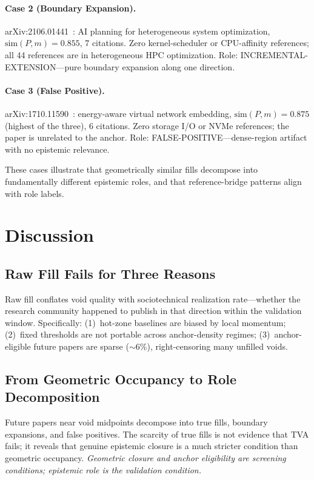\documentclass[sigconf]{acmart}
\newcommand{\tva}{\textsf{TVA}}
\begin{document}
\paragraph{Case 2 (Boundary Expansion).}
arXiv:2106.01441~\cite{case2}: AI planning for heterogeneous system optimization,
$\mathrm{sim}(P, m) = 0.855$, 7 citations.
Zero kernel-scheduler or CPU-affinity references; all 44 references are in
heterogeneous HPC optimization.
Role: INCREMENTAL-EXTENSION---pure boundary expansion along one direction.

\paragraph{Case 3 (False Positive).}
arXiv:1710.11590~\cite{case3}: energy-aware virtual network embedding,
$\mathrm{sim}(P, m) = 0.875$ (highest of the three), 6 citations.
Zero storage I/O or NVMe references; the paper is unrelated to the anchor.
Role: FALSE-POSITIVE---dense-region artifact with no epistemic relevance.

These cases illustrate that geometrically similar fills decompose into fundamentally
different epistemic roles, and that reference-bridge patterns align with role labels.

\section{Discussion}
\label{sec:discussion}

\subsection{Raw Fill Fails for Three Reasons}

Raw fill conflates void quality with sociotechnical realization rate---whether the
research community happened to publish in that direction within the validation window.
Specifically: (1)~hot-zone baselines are biased by local momentum;
(2)~fixed thresholds are not portable across anchor-density regimes;
(3)~anchor-eligible future papers are sparse ($\sim$6\%), right-censoring many unfilled voids.

\subsection{From Geometric Occupancy to Role Decomposition}

Future papers near void midpoints decompose into true fills, boundary expansions,
and false positives.
The scarcity of true fills is not evidence that \tva{} fails; it reveals that
genuine epistemic closure is a much stricter condition than geometric occupancy.
\emph{Geometric closure and anchor eligibility are screening conditions;
epistemic role is the validation condition.}
\end{document}
